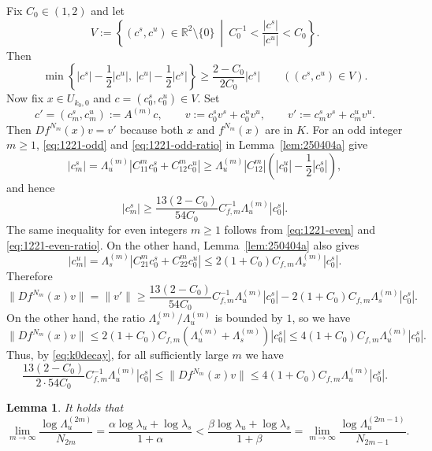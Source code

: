 \documentclass{amsart}
\theoremstyle{plain}
\newtheorem{lem}[thm]{Lemma}
\theoremstyle{definition}
\theoremstyle{remark}
\numberwithin{equation}{section}
\begin{document}
Fix $C_0\in (1,2)$ and let
\[
V:=
\left\{
(c^s,c^u)\in \mathbb R^2\setminus\{0\}
\ \middle|\ 
C_0^{-1}< \frac{|c^s|}{|c^u|}< C_0
\right\}.
\]
Then
\[
\min\left\{|c^s|-\frac12|c^u|,\ |c^u|-\frac12|c^s|\right\}
\ge \frac{2-C_0}{2C_0}|c^s|
\qquad ((c^s,c^u)\in V).
\]
Now fix $x\in U_{k_0,0}$ and $c=(c_0^s,c_0^u)\in V$.
Set
\[
c'=(c_m^s,c_m^u):=A^{(m)}c,
\qquad
v:=c_0^s v^s+c_0^u v^u,
\qquad
v':=c_m^s v^s+c_m^u v^u.
\]
Then $Df^{N_m}(x)v=v'$ because both $x$ and $f^{N_m}(x)$ are in $K$.
For an odd integer $m\ge 1$, \eqref{eq:1221-odd} and \eqref{eq:1221-odd-ratio} in Lemma~\ref{lem:250404a} give
\[
|c_m^s|
=\Lambda_u^{(m)}|C_{11}^m c_0^s+C_{12}^m c_0^u|
\ge \Lambda_u^{(m)}|C_{12}^m|\left(|c_0^u|-\frac12|c_0^s|\right),
\]
and hence
\[
|c_m^s|
\ge
\frac{13(2-C_0)}{54C_0}C_{f,m}^{-1}\Lambda_u^{(m)}|c_0^s|.
\]
The same inequality for even integers $m\ge 1$ follows from \eqref{eq:1221-even} and \eqref{eq:1221-even-ratio}.
On the other hand, Lemma~\ref{lem:250404a} also gives
\[
|c_m^u|
=\Lambda_s^{(m)}|C_{21}^m c_0^s+C_{22}^m c_0^u|
\le 2(1+C_0)C_{f,m}\Lambda_s^{(m)}|c_0^s|.
\]
Therefore
\[
\|Df^{N_m}(x)v\|
=\|v'\|
\ge
\frac{13(2-C_0)}{54C_0}C_{f,m}^{-1}\Lambda_u^{(m)}|c_0^s|
-2(1+C_0)C_{f,m}\Lambda_s^{(m)}|c_0^s|.
\]
On the other hand, the ratio $\Lambda_s^{(m)}/\Lambda_u^{(m)}$ is bounded by $1$, so we have
\[
\|Df^{N_m}(x)v\|
\le
2(1+C_0)C_{f,m}(\Lambda_u^{(m)}+\Lambda_s^{(m)})|c_0^s|\le 4(1+C_0) C_{f,m}\Lambda_u^{(m)}|c_0^s|.
\]
Thus, by \eqref{eq:k0decay},
for all sufficiently large $m$ we have
\begin{equation}\label{eq:0308d}
\frac{13(2-C_0)}{2\cdot 54C_0}C_{f,m}^{-1}\Lambda_u^{(m)}|c_0^s|
\le
\|Df^{N_m}(x)v\|
\le
4(1+C_0) C_{f,m}\Lambda_u^{(m)}|c_0^s|.
\end{equation}



\begin{lem}\label{lem:250404b}
It holds that
\[
\lim_{m\to\infty}\frac{\log\Lambda_u^{(2m)}}{N_{2m}}
=
\frac{\alpha\log\lambda_u+\log\lambda_s}{1+\alpha}
<
\frac{\beta\log\lambda_u+\log\lambda_s}{1+\beta}
=
\lim_{m\to\infty}\frac{\log\Lambda_u^{(2m-1)}}{N_{2m-1}}.
\]
\end{lem}
\end{document}
